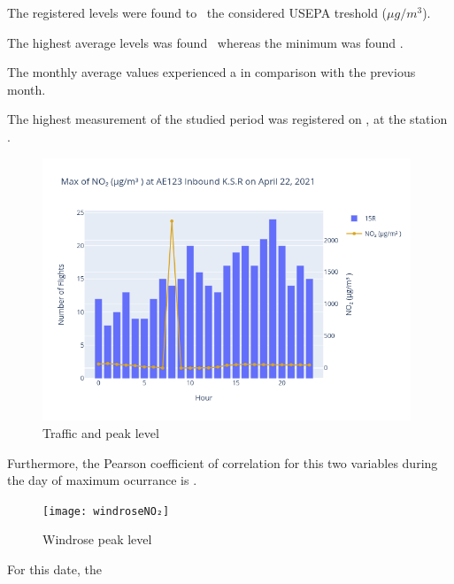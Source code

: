 \documentclass[12pt, oneside]{book}
\begin{document}
The registered  levels were found to \tresholdNOtwo\ the considered USEPA treshold (\limitNOtwo $\mu g/m^3$).

The highest average  levels was found \maxDailyNOtwo\ whereas the minimum was found \minDailyNOtwo.

The monthly average values experienced a \monthChangeNOtwo in comparison with the previous month.


The highest measurement of the studied period was registered on  \dayMaxNOtwo , at the station \stationMaxNOtwo.

{\begin{figure}[H]
\centering
\includegraphics[width=0.98\textwidth]{image11}
\caption{Traffic and  peak level}\label{image11}
\end{figure}}{}

Furthermore, the Pearson coefficient of correlation for this two variables during the day of maximum ocurrance is \correlOthree .  

{\begin{figure}[H]
\centering
	\texttt{[image: windroseNO₂]}
\caption{Windrose  peak level}\label{windroseNO2}
\end{figure}}{}

For this date, the \windNOtwo


\section{}
\end{document}
